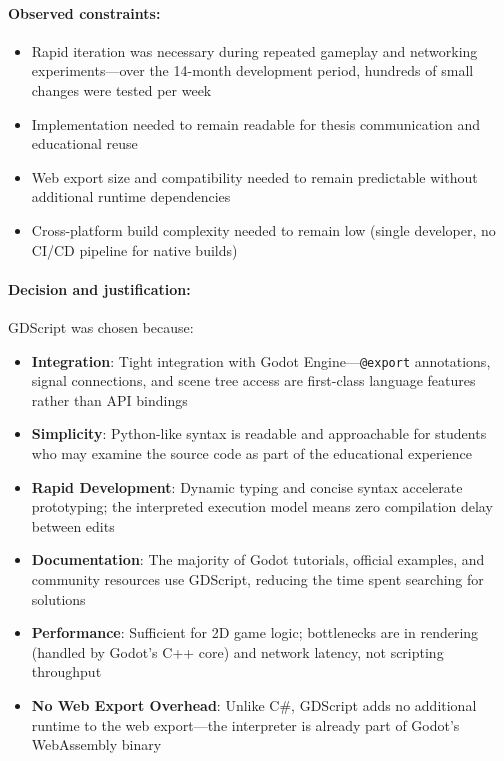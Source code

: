 \paragraph*{Observed constraints:}
\begin{itemize}
    \item Rapid iteration was necessary during repeated gameplay and networking experiments---over the 14-month development period, hundreds of small changes were tested per week
    \item Implementation needed to remain readable for thesis communication and educational reuse
    \item Web export size and compatibility needed to remain predictable without additional runtime dependencies
    \item Cross-platform build complexity needed to remain low (single developer, no CI/CD pipeline for native builds)
\end{itemize}

\paragraph*{Decision and justification:}

GDScript was chosen because:

\begin{itemize}
    \item \textbf{Integration}: Tight integration with Godot Engine---\texttt{@export} annotations, signal connections, and scene tree access are first-class language features rather than API bindings
    \item \textbf{Simplicity}: Python-like syntax is readable and approachable for students who may examine the source code as part of the educational experience
    \item \textbf{Rapid Development}: Dynamic typing and concise syntax accelerate prototyping; the interpreted execution model means zero compilation delay between edits
    \item \textbf{Documentation}: The majority of Godot tutorials, official examples, and community resources use GDScript, reducing the time spent searching for solutions
    \item \textbf{Performance}: Sufficient for 2D game logic; bottlenecks are in rendering (handled by Godot's C++ core) and network latency, not scripting throughput
    \item \textbf{No Web Export Overhead}: Unlike C\#, GDScript adds no additional runtime to the web export---the interpreter is already part of Godot's WebAssembly binary
\end{itemize}


